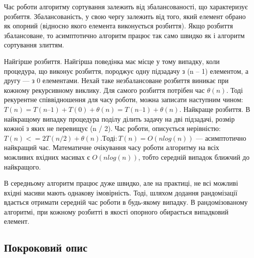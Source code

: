 \documentclass[12pt]{extarticle}
\begin{document}
Час роботи алгоритму сортування залежить від збалансованості, що характеризує розбиття. Збалансованість, у свою чергу залежить від того, який елемент обрано як опорний (відносно якого елемента виконується розбиття). Якщо розбиття збалансоване, то асимптотично алгоритм працює так само швидко як і алгоритм сортування злиттям. 

Найгірше розбиття. Найгірша поведінка має місце у тому випадку, коли процедура, що виконує розбиття, породжує одну підзадачу з (n – 1) елементом, а другу — з 0 елементами. Нехай таке незбалансоване розбиття виникає при кожному рекурсивному виклику. Для самого розбиття потрібен час $\theta(n)$. Тоді рекурентне співвідношення для часу роботи, можна записати наступним чином:$ T(n) = T(n – 1) + T(0) + \theta(n) = T(n ­– 1) + \theta(n). $
Найкраще розбиття. В найкращому випадку процедура поділу ділить задачу на дві підзадачі, розмір кожної з яких не перевищує (n / 2). Час роботи, описується нерівністю: $T(n) <= 2T(n / 2) + \theta(n). Тоді: T(n) = O(n log(n))$ — асимптотично найкращий час.
      Математичне очікування часу роботи алгоритму на всіх можливих вхідних масивах є $O(n log(n))$, тобто середній випадок ближчий до найкращого.

В середньому алгоритм працює дуже швидко, але на практиці, не всі можливі вхідні масиви мають однакову імовірність. Тоді, шляхом додання рандомізації вдається отримати середній час роботи в будь-якому випадку. В рандомізованому алгоритмі, при кожному розбитті в якості опорного обирається випадковий елемент.


\subsection*{Покроковий опис} 
\end{document}
